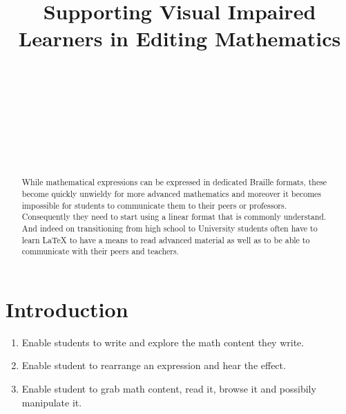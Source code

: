 \documentclass{sig-alternate}
\begin{document}


\title{Supporting Visual Impaired Learners in Editing Mathematics}
  

\author{
  \\
  \\
  \\
  \\
  \\
  \\
  \\
}

\maketitle

\begin{abstract}
  
  While mathematical expressions can be expressed in dedicated Braille formats,
  these become quickly unwieldy for more advanced mathematics and moreover it
  becomes impossible for students to communicate them to their peers or
  professors. Consequently they need to start using a linear format that is
  commonly understand. And indeed on transitioning from high school to
  University students often have to learn {\LaTeX} to have a means to read
  advanced material as well as to be able to communicate with their peers and
  teachers.

\end{abstract}



\enlargethispage{10pt}
\section{Introduction}

\begin{enumerate}
\item Enable students to write and explore the math content they write.
\item Enable student to rearrange an expression and hear the effect.
\item Enable student to grab math content, read it, browse it and possibily
  manipulate it.
\end{enumerate}
\end{document}
